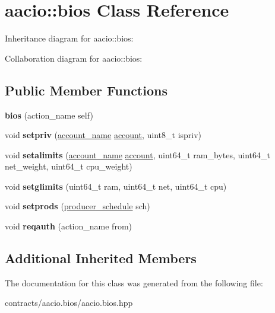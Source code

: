 \hypertarget{classaacio_1_1bios}{}\section{aacio\+:\+:bios Class Reference}
\label{classaacio_1_1bios}


Inheritance diagram for aacio\+:\+:bios\+:


Collaboration diagram for aacio\+:\+:bios\+:
\subsection*{Public Member Functions}
\begin{DoxyCompactItemize}
\item 
\mbox{\label{classaacio_1_1bios_a6eedd4c027dc09bc9352e82b59cf8018}} 
{\bfseries bios} (action\+\_\+name self)
\item 
\mbox{\label{classaacio_1_1bios_ad568c85b7e22b1a628f7de1028cf960c}} 
void {\bfseries setpriv} (\mbox{\hyperlink{structaacio_1_1chain_1_1name}{account\+\_\+name}} \mbox{\hyperlink{structaccount}{account}}, uint8\+\_\+t ispriv)
\item 
\mbox{\label{classaacio_1_1bios_a871a27089281f8a8d1444910cccd21cd}} 
void {\bfseries setalimits} (\mbox{\hyperlink{structaacio_1_1chain_1_1name}{account\+\_\+name}} \mbox{\hyperlink{structaccount}{account}}, uint64\+\_\+t ram\+\_\+bytes, uint64\+\_\+t net\+\_\+weight, uint64\+\_\+t cpu\+\_\+weight)
\item 
\mbox{\label{classaacio_1_1bios_a03d4022140b480bcfd693622ac3b1c71}} 
void {\bfseries setglimits} (uint64\+\_\+t ram, uint64\+\_\+t net, uint64\+\_\+t cpu)
\item 
\mbox{\label{classaacio_1_1bios_ae3a24aa961731bf884004243270d9218}} 
void {\bfseries setprods} (\mbox{\hyperlink{structaacio_1_1producer__schedule}{producer\+\_\+schedule}} sch)
\item 
\mbox{\label{classaacio_1_1bios_a99ea8e683e245a58163160b4308d04a8}} 
void {\bfseries reqauth} (action\+\_\+name from)
\end{DoxyCompactItemize}
\subsection*{Additional Inherited Members}


The documentation for this class was generated from the following file\+:\begin{DoxyCompactItemize}
\item 
contracts/aacio.\+bios/aacio.\+bios.\+hpp\end{DoxyCompactItemize}
